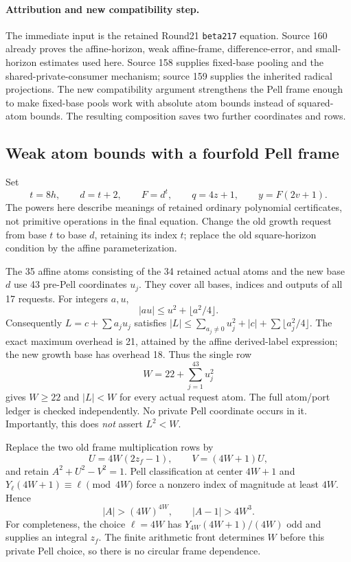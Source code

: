 \paragraph{Attribution and new compatibility step.}
The immediate input is the retained Round21 \texttt{beta217} equation.
Source 160 already proves the affine-horizon, weak affine-frame,
difference-error, and small-horizon estimates used here.
Source 158 supplies fixed-base pooling and the shared-private-consumer
mechanism; source 159 supplies the inherited radical projections.
The new compatibility argument strengthens the Pell frame enough to make
fixed-base pools work with absolute atom bounds instead of squared-atom
bounds.  The resulting composition saves two further coordinates and rows.

\subsection*{Weak atom bounds with a fourfold Pell frame}
Set
\[
 t=8h,\qquad d=t+2,\qquad F=d^t,
 \qquad q=4z+1,\qquad y=F(2v+1).
\]
The powers here describe meanings of retained ordinary polynomial
certificates, not primitive operations in the final equation.
Change the old growth request from base $t$ to base $d$, retaining its index $t$;
replace the old square-horizon condition by the affine parameterization.

The 35 affine atoms consisting of the 34 retained actual atoms and the new base
$d$ use 43 pre-Pell coordinates $u_j$.  They cover all bases, indices and outputs
of all 17 requests.  For integers $a,u$,
\[
 |au|\le u^2+\lfloor a^2/4\rfloor.
\]
Consequently $L=c+\sum a_ju_j$ satisfies
$|L|\le\sum_{a_j\ne0}u_j^2+|c|+\sum\lfloor a_j^2/4\rfloor$.
The exact maximum overhead is 21, attained by the affine derived-label
expression; the new growth base has overhead 18.  Thus the single row
\[
 W=22+\sum_{j=1}^{43}u_j^2
 \tag{AF}
\]
gives $W\ge22$ and $|L|<W$ for every actual request atom.  The full atom/port
ledger is checked independently.  No private Pell coordinate occurs in it.
Importantly, this does \emph{not} assert $L^2<W$.

Replace the two old frame multiplication rows by
\[
 U=4W(2z_f-1),\qquad V=(4W+1)U,
\]
and retain $A^2+U^2-V^2=1$.  Pell classification at center $4W+1$ and
$Y_\ell(4W+1)\equiv\ell\pmod{4W}$ force a nonzero index of magnitude at least
$4W$.  Hence
\[
 |A|>(4W)^{4W},\qquad |A-1|>4W^3.\tag{PG}
\]
For completeness, the choice $\ell=4W$ has $Y_{4W}(4W+1)/(4W)$ odd and supplies
an integral $z_f$.  The finite arithmetic front determines $W$ before this
private Pell choice, so there is no circular frame dependence.

